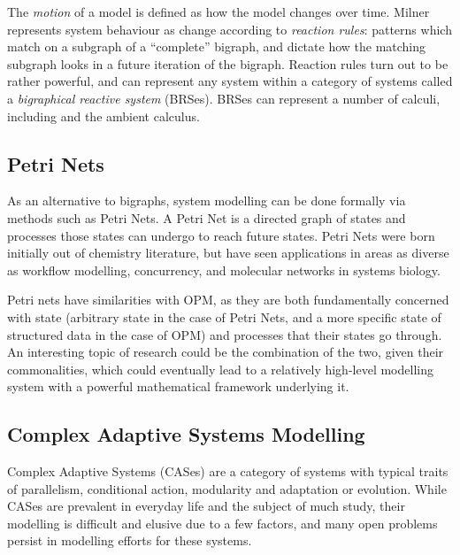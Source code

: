 \documentclass{article}
\begin{document}
The \emph{motion} of a model is defined as how the model changes over time.
Milner represents system behaviour as change according to \emph{reaction rules}:
patterns which match on a subgraph of a ``complete'' bigraph, and dictate how
the matching subgraph looks in a future iteration of the bigraph. Reaction rules
turn out to be rather powerful, and can represent any system within a category
of systems called a \emph{bigraphical reactive
  system}\cite{milner_early_brs_definition} (BRSes). BRSes can represent a
number of calculi, including \picalculus{} and the ambient
calculus\cite{bigraphs_and_transitions_milner_jensen}.\par



\subsection{Petri Nets}
\label{subsubsec:petrinets}
As an alternative to bigraphs, system modelling can be done formally via methods
such as Petri Nets\cite{petri_net_seminal}. A Petri Net is a directed graph of
states and processes those states can undergo to reach future states. Petri Nets
were born initially out of chemistry literature\cite{petri_net_seminal}, but
have seen applications in areas as diverse as workflow
modelling\cite{petri_net_workflow_modelling},
concurrency\cite{petri_net_concurrency}, and molecular networks in systems
biology\cite{petri_nets_for_biology}.\par

Petri nets have similarities with OPM, as they are both fundamentally concerned
with state (arbitrary state in the case of Petri Nets, and a more specific state
of structured data in the case of OPM) and processes that their states go
through. An interesting topic of research could be the combination of the two,
given their commonalities, which could eventually lead to a relatively
high-level modelling system with a powerful mathematical framework underlying
it.\par


\subsection{Complex Adaptive Systems Modelling}
Complex Adaptive Systems (CASes) are a category of systems with typical traits
of parallelism, conditional action, modularity and adaptation or evolution\cite{holland_studying_adaptive_systems}.
While CASes are prevalent in everyday life and the subject of much study, their
modelling is difficult and elusive due to a few factors, and many open problems
persist in modelling efforts for these systems\cite{gell-mann}.\par
\end{document}
